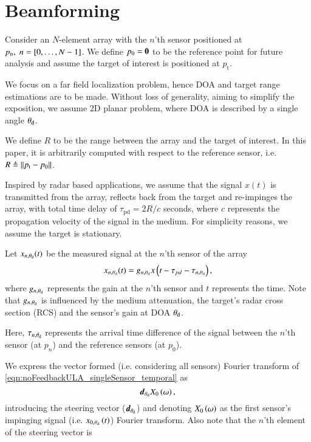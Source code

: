 \section{Beamforming}\label{sec:setup}
Consider an $N$-element array with the $n$'th sensor positioned at $p_{\text{n}},\; n=\left[{0,\ldots,N-1}\right]$. We define $p_{0}=\boldsymbol{0}$ to be the reference point for future analysis and assume the target of interest is positioned at $p_{\text{t}}$.
\par We focus on a far field localization problem, hence DOA and target range estimations are to be made. Without loss of generality, aiming to simplify the exposition, we assume $2\text{D}$ planar problem, where DOA is described by a single angle $\theta_{\text{d}}$. 
\par We define $R$ to be the range between the array and the target of interest. In this paper, it is arbitrarily computed with respect to the reference sensor, i.e. $R\triangleq\left\Vert p_{\text{t}}-p_{0}\right\Vert$.
\par Inspired by radar based applications, we assume that the signal $x(t)$ is transmitted from the array, reflects back from the target and re-impinges the array, with total time delay of $\tau_{\text{pd}}=2R/c$ seconds, where $c$ represents the propagation velocity of the signal in the medium. For simplicity reasons, we assume the target is stationary.
\par Let $x_{n,\theta_{\text{d}}}(t)$ be the measured signal at the $n$'th sensor of the array
\begin{equation}
x_{n,\thetaD}(t) = g_{n,\thetaD}x\Brack{t-\tau_{pd}-\tau_{n,\thetaD}},
\label{eqn:noFeedbackULA_singleSensor_temporal}
\end{equation}
where $g_{n,\theta_{\text{d}}}$ represents the gain at the $n$'th sensor and $t$ represents the time. Note that $g_{n,\theta_{\text{d}}}$ is influenced by the medium attenuation, the target's radar cross section (RCS) and the sensor's gain at DOA $\theta_{\text{d}}$. 
\par Here, $\tau_{n,\theta_{\text{d}}}$ represents the arrival time difference of the signal between the $n$'th sensor (at $p_{n}$) and the reference sensors (at $p_{0}$). 
\par We express the vector formed (i.e. considering all sensors) Fourier transform of \eqref{eqn:noFeedbackULA_singleSensor_temporal} as
\[
\Steer{\thetaD}\F{x}_{0}\rBrace{\omega},
\]
introducing the steering vector ($\boldsymbol{d}_{\theta_{\text{d}}}$) and denoting $\F{x}_{0}\rBrace{\omega}$ as the first sensor's impinging signal (i.e. $x_{0,\theta_{\text{d}}}\left({t}\right)$) Fourier transform. Also note that the $n$'th element of the steering vector is
